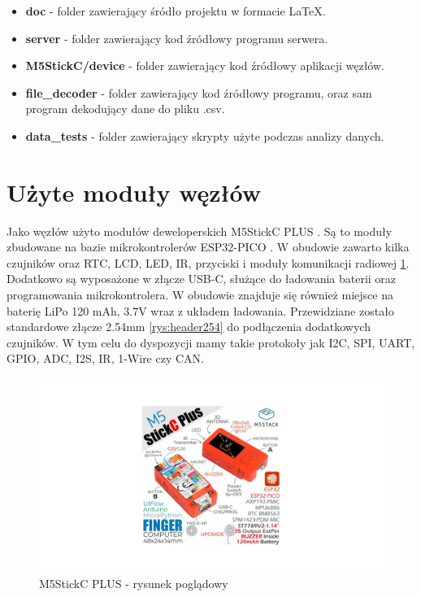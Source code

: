 \documentclass[12pt,oneside,a4paper]{book}
\theoremstyle{break}
\begin{document}
\begin{itemize}
    \item \textbf{doc} - folder zawierający śródło projektu w formacie LaTeX.
    \item \textbf{server} - folder zawierający kod źródłowy programu serwera.
    \item \textbf{M5StickC/device} - folder zawierający kod źródłowy aplikacji węzłów.
    \item \textbf{file\_decoder} - folder zawierający kod źródłowy programu, oraz sam program dekodujący dane do pliku .csv.
    \item \textbf{data\_tests} - folder zawierający skrypty użyte podczas analizy danych.
\end{itemize}

\section{Użyte moduły węzłów}
Jako węzłów użyto modułów deweloperskich M5StickC PLUS \cite{m5stick}. Są to moduły
zbudowane na bazie mikrokontrolerów ESP32-PICO \cite{esp32pico}. W obudowie zawarto
kilka czujników oraz RTC, LCD, LED, IR, przyciski
i moduły komunikacji radiowej \ref{rys:mstick}. Dodatkowo są wyposażone w złącze 
USB-C, służące  do ładowania baterii oraz
programowania mikrokontrolera. W obudowie znajduje się również miejsce na baterię LiPo 120 mAh, 3.7V
wraz z układem ładowania. Przewidziane zostało standardowe złącze 2.54mm \ref{rys:header254} do podłączenia dodatkowych czujników.
W tym celu do dyspozycji mamy takie protokoły jak I2C, SPI, UART, GPIO, ADC, I2S, IR, 1-Wire czy CAN.


\begin{figure}[H]
    \begin{center}
        \includegraphics[width=1\textwidth]{m5sitckc.png}    
        \caption{M5StickC PLUS - rysunek poglądowy}
        \label{rys:mstick}
    \end{center}
\end{figure}
\end{document}
